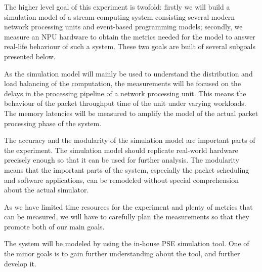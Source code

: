 The higher level goal of this experiment is twofold: firstly we will build a simulation model of a stream computing system consisting several modern network processing units and event-based programming models; secondly, we measure an NPU hardware to obtain the metrics needed for the model to answer real-life behaviour of such a system. These two goals are built of several subgoals presented below.

As the simulation model will mainly be used to understand the distribution and load balancing of the computation, the measurements will be focused on the delays in the processing pipeline of a network processing unit. This means the behaviour of the packet throughput time of the unit under varying workloads. The memory latencies will be measured to amplify the model of the actual packet processing phase of the system.

The accuracy and the modularity of the simulation model are important parts of the experiment. The simulation model should replicate real-world hardware precisely enough so that it can be used for further analysis. The modularity means that the important parts of the system, especially the packet scheduling and software applications, can be remodeled without special comprehension about the actual simulator.

As we have limited time resources for the experiment and plenty of metrics that can be measured, we will have to carefully plan the measurements so that they promote both of our main goals.

The system will be modeled by using the in-house PSE simulation tool. One of the minor goals is to gain further understanding about the tool, and further develop it.

